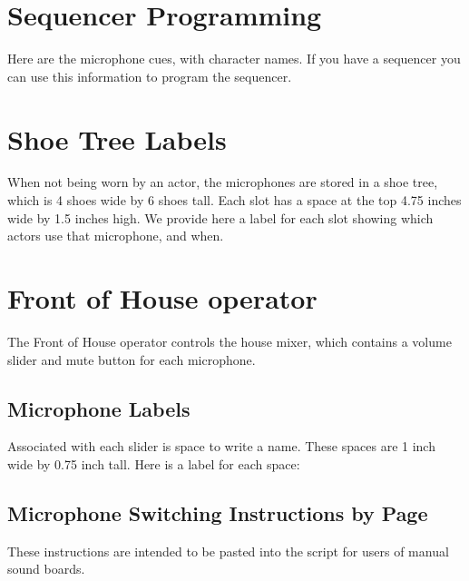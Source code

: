 \documentclass[letterpaper]{article}
\begin{document}
\section {Sequencer Programming}

Here are the microphone cues, with character names.  If you
have a sequencer you can use this information to program
the sequencer.



\section {Shoe Tree Labels}

When not being worn by an actor, the microphones are stored in a shoe tree,
which is 4 shoes wide by 6 shoes tall.  
Each slot has a space at the top 4.75 inches wide
by 1.5 inches high.  We provide here a label for each slot showing which
actors use that microphone, and when.

{\Large

}

\section {Front of House operator}

The Front of House operator controls the house mixer, 
which contains a volume slider
and mute button for each microphone.  

\subsection {Microphone Labels}

Associated with each slider is space to write a name.  
These spaces are 1 inch wide by 0.75 inch tall.  
Here is a label for each space:

{\Large

}

\subsection {Microphone Switching Instructions by Page}

These instructions are intended to be pasted into the script
for users of manual sound boards.


\end{document}
